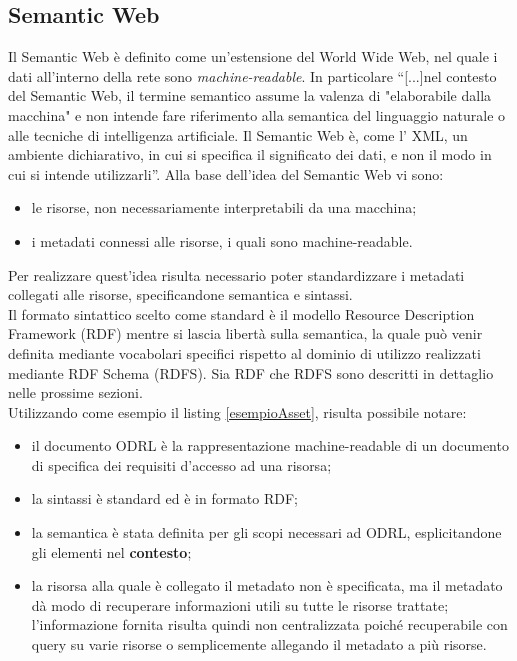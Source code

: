 \documentclass[12pt,a4paper,twoside]{book}
\begin{document}
\subsection{Semantic Web}
Il Semantic Web è definito come un'estensione del World Wide Web, nel quale i dati all'interno della rete sono \textit{machine-readable}. In particolare ``[...]nel contesto del Semantic Web, il termine semantico assume la valenza di
"elaborabile dalla macchina" e non intende fare riferimento alla semantica del 
linguaggio naturale o alle tecniche di intelligenza artificiale. Il Semantic Web è, come l’
XML, un ambiente dichiarativo, in cui si specifica il significato dei dati, e non il modo
in cui si intende utilizzarli''\cite{introSem}. Alla base dell'idea del Semantic Web vi sono:
\begin{itemize}
	\item le risorse, non necessariamente interpretabili da una macchina;
	\item i metadati connessi alle risorse, i quali sono machine-readable.
\end{itemize}
Per realizzare quest'idea risulta necessario poter standardizzare i metadati collegati alle risorse, specificandone semantica e sintassi.\\
Il formato sintattico scelto come standard è il modello Resource Description Framework (RDF)\cite{RDF} mentre si lascia libertà sulla semantica, la quale può venir definita mediante vocabolari specifici rispetto al dominio di utilizzo realizzati mediante RDF Schema (RDFS)\cite{RDFS}. Sia RDF che RDFS sono descritti in dettaglio nelle prossime sezioni.\\
Utilizzando come esempio il listing \ref{esempioAsset}, risulta possibile notare:
\begin{itemize}
	\item il documento ODRL è la rappresentazione machine-readable di un documento di specifica dei requisiti d'accesso ad una risorsa;
	\item la sintassi è standard ed è in formato RDF;
	\item la semantica è stata definita per gli scopi necessari ad ODRL, esplicitandone gli elementi nel \textbf{contesto};
	\item la risorsa alla quale è collegato il metadato non è specificata, ma il metadato dà modo di recuperare informazioni utili su tutte le risorse trattate; l'informazione fornita risulta quindi non centralizzata poiché recuperabile con query su varie risorse o semplicemente allegando il metadato a più risorse.
\end{itemize}
\end{document}
